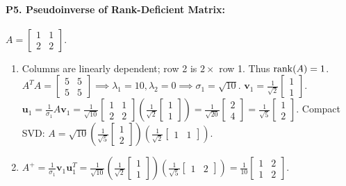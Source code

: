 \paragraph{P5. Pseudoinverse of Rank-Deficient Matrix:}
$A = \begin{bmatrix} 1 & 1 \\ 2 & 2 \end{bmatrix}$.
\begin{enumerate}[label=(\alph*)]
    \item Columns are linearly dependent; row 2 is $2 \times$ row 1. Thus $\operatorname{rank}(A) = 1$.
    $A^T A = \begin{bmatrix} 5 & 5 \\ 5 & 5 \end{bmatrix} \implies \lambda_1 = 10, \lambda_2 = 0 \implies \sigma_1 = \sqrt{10}$.
    $\mathbf{v}_1 = \frac{1}{\sqrt{2}}\begin{bmatrix} 1 \\ 1 \end{bmatrix}$.
    $\mathbf{u}_1 = \frac{1}{\sigma_1}A\mathbf{v}_1 = \frac{1}{\sqrt{10}}\begin{bmatrix} 1 & 1 \\ 2 & 2 \end{bmatrix}\left(\frac{1}{\sqrt{2}}\begin{bmatrix} 1 \\ 1 \end{bmatrix}\right) = \frac{1}{\sqrt{20}}\begin{bmatrix} 2 \\ 4 \end{bmatrix} = \frac{1}{\sqrt{5}}\begin{bmatrix} 1 \\ 2 \end{bmatrix}$.
    Compact SVD: $A = \sqrt{10} \left( \frac{1}{\sqrt{5}}\begin{bmatrix} 1 \\ 2 \end{bmatrix} \right) \left( \frac{1}{\sqrt{2}}\begin{bmatrix} 1 & 1 \end{bmatrix} \right)$.
    \item $A^+ = \frac{1}{\sigma_1} \mathbf{v}_1 \mathbf{u}_1^T = \frac{1}{\sqrt{10}} \left(\frac{1}{\sqrt{2}}\begin{bmatrix} 1 \\ 1 \end{bmatrix}\right) \left(\frac{1}{\sqrt{5}}\begin{bmatrix} 1 & 2 \end{bmatrix}\right) = \frac{1}{10}\begin{bmatrix} 1 & 2 \\ 1 & 2 \end{bmatrix}$.

\end{enumerate}
